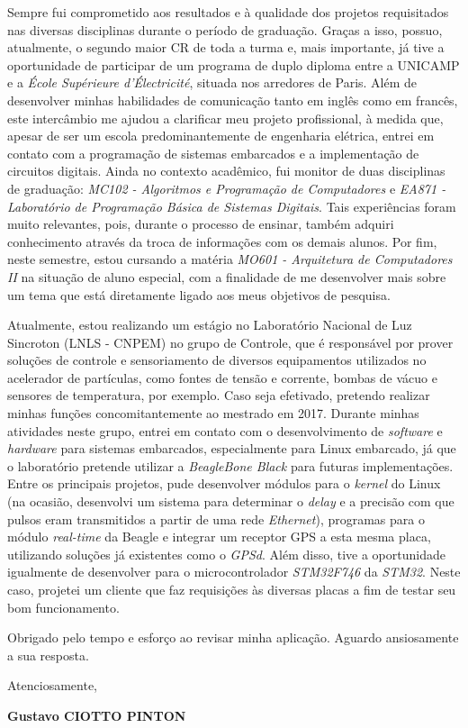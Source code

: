 \documentclass[12pt, a4paper]{article}
\begin{document}
\vspace{12pt}

Sempre fui comprometido aos resultados e à qualidade dos projetos requisitados
nas diversas disciplinas durante o período de graduação. Graças a isso, possuo,
atualmente, o segundo maior CR de toda a turma e, mais importante, já tive a
oportunidade de participar de um programa de duplo diploma entre a UNICAMP e a
\textit{École Supérieure d'Électricité}, situada nos arredores de Paris. Além de
desenvolver minhas habilidades de comunicação tanto em inglês como em francês,
este intercâmbio me ajudou a clarificar meu projeto profissional, à medida que,
apesar de ser um escola predominantemente de engenharia elétrica, entrei em contato com a
programação de sistemas embarcados e a implementação de circuitos digitais.
Ainda no contexto acadêmico, fui monitor de duas disciplinas de graduação:
\textit{MC102 - Algoritmos e Programação de Computadores} e \textit{EA871 -
Laboratório de Programação Básica de Sistemas Digitais}. Tais experiências foram
muito relevantes, pois, durante o processo de ensinar, também adquiri 
conhecimento através da troca de informações com os demais alunos. Por fim,
neste semestre, estou cursando a matéria \textit{MO601 - Arquitetura de
Computadores II} na situação de aluno especial, com a finalidade de me
desenvolver  mais sobre um tema que está diretamente ligado aos meus objetivos
de pesquisa.

\vspace{12pt}

Atualmente, estou realizando um estágio no Laboratório Nacional de Luz Sincroton
(LNLS - CNPEM) no grupo de Controle, que é responsável por prover soluções de
controle e sensoriamento de diversos equipamentos utilizados no acelerador de
partículas, como fontes de tensão e corrente, bombas de vácuo e sensores de
temperatura, por exemplo. Caso seja efetivado, pretendo realizar minhas funções
concomitantemente ao mestrado em 2017. Durante minhas atividades neste grupo,
entrei em contato com o desenvolvimento de \textit{software} e \textit{hardware} para sistemas embarcados, especialmente para Linux embarcado, já que o laboratório
pretende utilizar a \textit{BeagleBone Black} para futuras implementações. Entre
os principais projetos, pude desenvolver módulos para o \textit{kernel} do Linux
(na ocasião, desenvolvi um sistema para determinar o \textit{delay} e a precisão com
que pulsos eram transmitidos a partir de uma rede \textit{Ethernet}), programas
para o módulo \textit{real-time} da Beagle e integrar um receptor GPS a esta
mesma placa, utilizando soluções já existentes como o \textit{GPSd}. Além disso,
tive a oportunidade igualmente de desenvolver para o microcontrolador
\textit{STM32F746} da \textit{STM32}. Neste caso, projetei um cliente que faz
requisições às diversas placas a fim de testar seu bom funcionamento.

\vspace{12pt}

Obrigado pelo tempo e esforço ao revisar minha aplicação. Aguardo ansiosamente a sua resposta.

\vspace{12pt}

Atenciosamente,

\begin{flushright}
\textbf{Gustavo CIOTTO PINTON}
\end{flushright}
\end{document}
